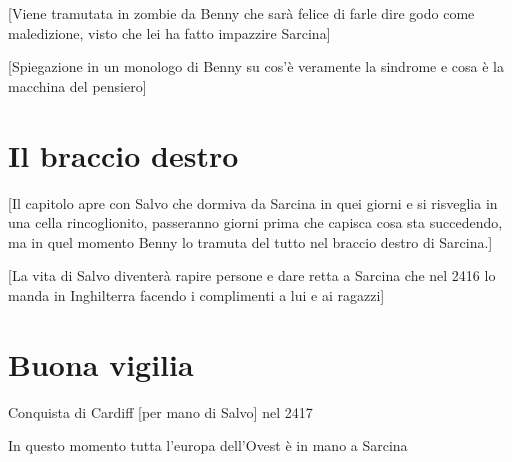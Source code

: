 [Viene tramutata in zombie da Benny che sarà felice di farle dire godo come maledizione, visto che lei ha fatto impazzire Sarcina]

[Spiegazione in un monologo di Benny su cos'è veramente la sindrome e cosa è la macchina del pensiero]


\section{Il braccio destro}

[Il capitolo apre con Salvo che dormiva da Sarcina in quei giorni e si risveglia in una cella rincoglionito, passeranno giorni prima che capisca cosa sta succedendo, ma in quel momento Benny lo tramuta del tutto nel braccio destro di Sarcina.]

[La vita di Salvo diventerà rapire persone e dare retta a Sarcina che nel 2416 lo manda in Inghilterra facendo i complimenti a lui e ai ragazzi]

\section{Buona vigilia}
Conquista di Cardiff [per mano di Salvo] nel 2417

In questo momento tutta l'europa dell'Ovest è in mano a Sarcina
